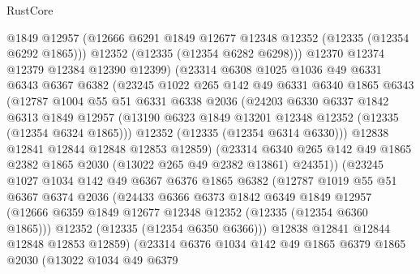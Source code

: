 \begin{lexlean}{RustCore}
\begin{coremodule}
              @1849
              @12957
              (@12666 @6291 @1849 @12677 @12348 @12352 (@12335 (@12354 @6292 @1865)))
              @12352
              (@12335 (@12354 @6282 @6298)))
            @12370
            @12374
            @12379
            @12384
            @12390
            @12399)
          (@23314
            @6308
            @1025
            @1036
            @49
            @6331
            @6343
            @6367
            @6382
            (@23245
              @1022
              @265
              @142
              @49
              @6331
              @6340
              @1865
              @6343
              (@12787
                @1004
                @55
                @51
                @6331
                @6338
                @2036
                (@24203
                  @6330
                  @6337
                  @1842
                  @6313
                  @1849
                  @12957
                  (@13190 @6323 @1849 @13201 @12348 @12352 (@12335 (@12354 @6324 @1865)))
                  @12352
                  (@12335 (@12354 @6314 @6330)))
                @12838
                @12841
                @12844
                @12848
                @12853
                @12859)
              (@23314
                @6340
                @265
                @142
                @49
                @1865
                @2382
                @1865
                @2030
                (@13022 @265 @49 @2382 @13861)
                @24351))
            (@23245
              @1027
              @1034
              @142
              @49
              @6367
              @6376
              @1865
              @6382
              (@12787
                @1019
                @55
                @51
                @6367
                @6374
                @2036
                (@24433
                  @6366
                  @6373
                  @1842
                  @6349
                  @1849
                  @12957
                  (@12666 @6359 @1849 @12677 @12348 @12352 (@12335 (@12354 @6360 @1865)))
                  @12352
                  (@12335 (@12354 @6350 @6366)))
                @12838
                @12841
                @12844
                @12848
                @12853
                @12859)
              (@23314
                @6376
                @1034
                @142
                @49
                @1865
                @6379
                @1865
                @2030
                (@13022
                  @1034
                  @49
                  @6379

\end{coremodule}
\end{lexlean}
